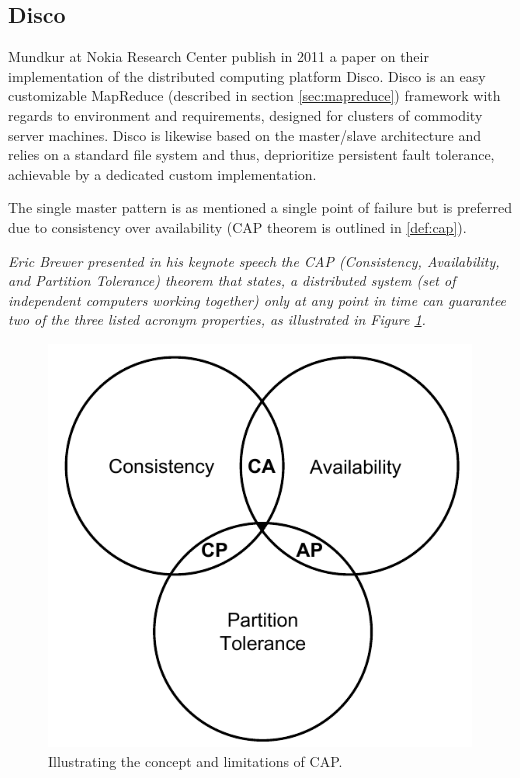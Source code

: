 \subsection*{Disco}
Mundkur \etal at Nokia Research Center publish in 2011 a paper on their implementation of the distributed computing platform Disco\cite{PageDisco}\cite{Mundkur:2011:DCP:2034654.2034670}. Disco is an easy customizable MapReduce (described in section \ref{sec:mapreduce}) framework with regards to environment and requirements, designed for clusters of commodity server machines. Disco is likewise based on the master/slave architecture and relies on a standard file system and thus, deprioritize persistent fault tolerance, achievable by a dedicated custom implementation. 

The single master pattern is as mentioned a single point of failure but is preferred due to consistency over availability (CAP theorem is outlined in \ref{def:cap}).
\vspace*{5mm}

\begin{definition} \label{def:cap}
\textit{Eric Brewer presented in his keynote speech}\cite{Brewer2000} \textit{the CAP (Consistency, Availability, and Partition Tolerance) theorem that states, a distributed system (set of independent computers working together) only at any point in time can guarantee two of the three listed acronym properties, as illustrated in Figure \ref{fig:cap}.}

\begin{figure}[h!]
	\centering
	\includegraphics[scale=0.7]{pdf/cap.pdf}
	\caption{Illustrating the concept and limitations of CAP. \label{fig:cap}}
\end{figure}	
\end{definition}

